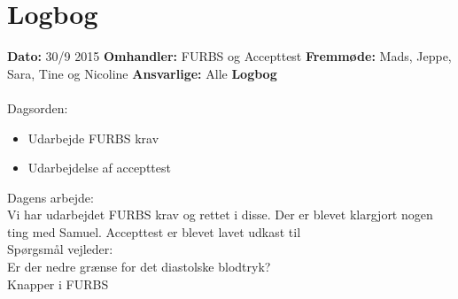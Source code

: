 \chapter{Logbog}

\textbf{Dato:} 30/9 2015 
\textbf{Omhandler:} FURBS og Accepttest
\textbf{Fremmøde:} Mads, Jeppe, Sara, Tine og Nicoline
\textbf{Ansvarlige:} Alle
\textbf{Logbog}
\\
\\
Dagsorden:
\begin{itemize}
	\item Udarbejde FURBS krav
	\item Udarbejdelse af accepttest
\end{itemize}

Dagens arbejde: \\
Vi har udarbejdet FURBS krav og rettet i disse.  
Der er blevet klargjort nogen ting med Samuel.
Accepttest er blevet lavet udkast til\\


Spørgsmål vejleder: \\
Er der nedre grænse for det diastolske blodtryk?\\
Knapper i FURBS\\

